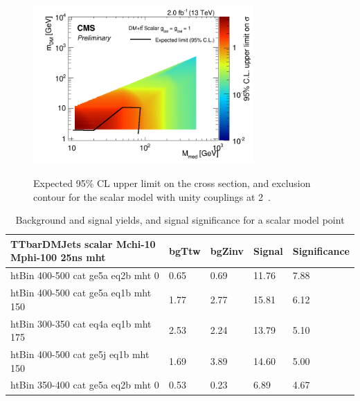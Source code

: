 \clearpage


\clearpage

\begin{figure}
\begin{center}
\includegraphics[width=0.75\textwidth]{figures/DMplots/dm_DMttS_2p0fb_2dlimits.png} \\
\caption{Expected 95\% CL upper limit on the cross section, and exclusion
contour for the scalar \DMtt model with unity couplings at 2~\ifb.}
\label{fig:dm_DMttS_2fb_2dlimits}
\end{center}
\end{figure}

\clearpage

\begin{table}
\small
\begin{center}
\caption{Background and signal yields, and signal significance for a scalar \DMtt model point}
\label{tab:MSB_DMttS_2fb}
\begin{tabular}{|l|l|l|l|l|}
\textbf{TTbarDMJets scalar Mchi-10 Mphi-100 25ns mht}    &  bgTtw    &  bgZinv   &  Signal &     Significance \\ 
\hline
htBin 400-500 cat ge5a eq2b mht 0 &     0.65     &  0.69     &  11.76   &7.88 \\ 
htBin 400-500 cat ge5a eq1b mht 150 &   1.77     &  2.77     &  15.81   &6.12 \\ 
htBin 300-350 cat eq4a eq1b mht 175 &   2.53     &  2.24     &  13.79   &5.10 \\ 
htBin 400-500 cat ge5j eq1b mht 150 &   1.69     &  3.89     &  14.60   &5.00 \\ 
htBin 350-400 cat ge5a eq2b mht 0 &     0.53     &  0.23     &  6.89    &4.67 \\ 
\end{tabular}
\end{center}
\end{table}


